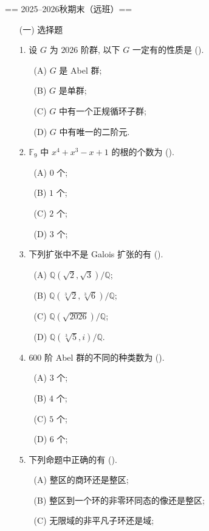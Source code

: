 == 2025--2026秋期末（远班）==
\begin{itemize}
\item[(一)] 选择题
    \item[1.] 设 $G$ 为 $2026$ 阶群, 以下 $G$ 一定有的性质是 ().
    \begin{itemize}
        \item[(A)] $G$ 是 Abel 群;
        \item[(B)] $G$ 是单群;
        \item[(C)] $G$ 中有一个正规循环子群;
        \item[(D)] $G$ 中有唯一的二阶元.
    \end{itemize}
    \item[2.] $\mathbb{F}_9$ 中 $x^4 + x^3 - x + 1$ 的根的个数为 ().
    \begin{itemize}
        \item[(A)] $0$ 个;
        \item[(B)] $1$ 个;
        \item[(C)] $2$ 个;
        \item[(D)] $3$ 个;
    \end{itemize}
    \item[3.] 下列扩张中不是 Galois 扩张的有 ().
    \begin{itemize}
        \item[(A)] $\mathbb{Q}(\sqrt{2}, \sqrt{3}) / \mathbb{Q}$;
        \item[(B)] $\mathbb{Q}(\sqrt[3]{2}, \sqrt[3]{6}) / \mathbb{Q}$;
        \item[(C)] $\mathbb{Q}(\sqrt{2026})/\mathbb{Q}$;
        \item[(D)] $\mathbb{Q}(\sqrt[3]{5}, i) / \mathbb{Q}$.
    \end{itemize}
    \item[4.] $600$ 阶 Abel 群的不同的种类数为 ().
    \begin{itemize}
        \item[(A)] $3$ 个;
        \item[(B)] $4$ 个;
        \item[(C)] $5$ 个;
        \item[(D)] $6$ 个;
    \end{itemize}
    \item[5.] 下列命题中正确的有 ().
    \begin{itemize}
        \item[(A)] 整区的商环还是整区;
        \item[(B)] 整区到一个环的非零环同态的像还是整区;
        \item[(C)] 无限域的非平凡子环还是域;

\end{itemize}
\end{itemize}
